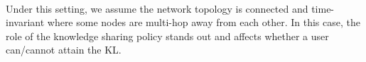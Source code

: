 \documentclass[12pt,epsf]{article}
\theoremstyle{definition}
\begin{document}
%
\vspace{-0.2 cm}
\\
Under this setting, we assume the network topology is connected and time-invariant where some nodes are multi-hop away from each other. In this case, the role of
the knowledge sharing policy stands out and affects whether a user can/cannot attain the KL.
%
%
\end{document}
